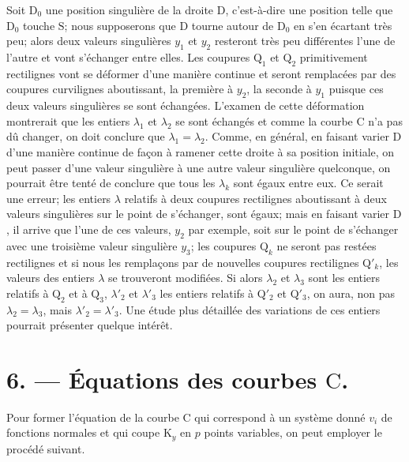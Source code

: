 \documentclass{article}
\begin{document}
Soit $\mathrm{D}_{0}$ une position singulière de la droite $\mathrm{D}$, c'est-à-dire une position telle que $\mathrm{D}_{0}$ touche $\mathrm{S}$; nous supposerons que $\mathrm{D}$ tourne autour de $\mathrm{D}_{0}$ en s'en écartant très peu; alors deux valeurs singulières $y_{1}$ et $y_{2}$ resteront très peu différentes l'une de l'autre et vont s'échanger entre elles. Les coupures $\mathrm{Q}_{1}$ et $\mathrm{Q}_{2}$ primitivement rectilignes vont se déformer d'une manière continue et seront remplacées par des coupures curvilignes aboutissant, la première à $y_{2}$, la seconde à $y_{1}$ puisque ces deux valeurs singulières se sont échangées. L'examen de cette déformation montrerait que les entiers $\lambda_{1}$ et $\lambda_{2}$ se sont échangés et comme la courbe $\mathrm{C}$ n'a pas dû changer, on doit conclure que $\lambda_{1} = \lambda_{2}$. Comme, en général, en faisant varier $\mathrm{D}$ d'une manière continue de façon à ramener cette droite à sa position initiale, on peut passer d'une valeur singulière à une autre valeur singulière quelconque, on pourrait être tenté de conclure que tous les $\lambda_{k}$ sont égaux entre eux. Ce serait une erreur; les entiers $\lambda$ relatifs à deux coupures rectilignes aboutissant à deux valeurs singulières sur le point de s'échanger, sont égaux; mais en faisant varier $\mathrm{D}$, il arrive que l'une de ces valeurs, $y_{2}$ par exemple, soit sur le point de s'échanger avec une troisième valeur singulière $y_{3}$; les coupures $\mathrm{Q}_{k}$ ne seront pas restées rectilignes et si nous les remplaçons par de nouvelles coupures rectilignes $\mathrm{Q}'_{k}$, les valeurs des entiers $\lambda$ se trouveront modifiées. Si alors $\lambda_{2}$ et $\lambda_{3}$ sont les entiers relatifs à $\mathrm{Q}_{2}$ et à $\mathrm{Q}_{3}$, $\lambda'_{2}$ et $\lambda'_{3}$ les entiers relatifs à $\mathrm{Q}'_{2}$ et $\mathrm{Q}'_{3}$, on aura, non pas $\lambda_{2} = \lambda_{3}$, mais $\lambda'_{2} = \lambda'_{3}$. Une étude plus détaillée des variations de ces entiers pourrait présenter quelque intérêt.

\section*{6. --- Équations des courbes $\mathrm{C}$.}

Pour former l'équation de la courbe $\mathrm{C}$ qui correspond à un système donné $v_{i}$ de fonctions normales et qui coupe $\mathrm{K}_{y}$ en $p$ points variables, on peut employer le procédé suivant.
\end{document}
